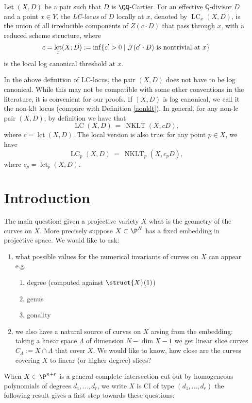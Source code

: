 \documentclass[12pt]{article}
\theoremstyle{plain}
\DeclareMathOperator{\NKLT}{NKLT}
\DeclareMathOperator{\LC}{LC}
\DeclareMathOperator{\lct}{lct}
\newcommand{\mb}[1]{\mathbb{#1}}
\begin{document}
\begin{defn}
Let $(X, D)$ be a pair such that $D$ is $\QQ$-Cartier. For an effective $\mb{Q}$-divisor $D$ and a point $x\in Y$, the \emph{LC-locus} of $D$ locally at $x$, denoted by $\LC_x(X,D)$, is the union of all irreducible components of $Z(c\cdot D)$ that pass through $x$, with a reduced scheme structure, where
\[ c = \lct_x(X;D) := \inf \{ c' > 0 \mid \mtc{J}(c' \cdot D) \text{ is nontrivial at } x \} \]
is the local log canonical threshold at $x$.
\end{defn}

\begin{remark}
    \textup{In the above definition of LC-locus, the pair $(X,D)$ does not have to be log canonical. While this may not be compatible with some other conventions in the literature, it is convenient for our proofs. If $(X,D)$ is log canonical, we call it the non-klt locus (compare with Definition \ref{nonklt}). In general, for any non-lc pair $(X,D)$, by definition we have that
    \[ \LC(X,D)\ =\ \NKLT(X,cD), \]
    where $c=\lct(X,D)$. The local version is also true: for any point $p\in X$, we have $$\LC_p(X,D)\ =\ \NKLT_p(X,c_pD),$$ where $c_p=\lct_p(X,D)$. }
\end{remark}

\newpage

\section{Introduction}

The main question: given a projective variety $X$ what is the geometry of the curves on $X$. More precisely suppose $X \subset \P^N$ has a fixed embedding in projective space. We would like to ask:
\begin{enumerate}
\item what possible values for the numerical invariants of curves on $X$ can appear e.g.
\begin{enumerate}
\item degree (computed against $\struct{X}(1)$)
\item genus 
\item gonality
\end{enumerate}
\item we also have a natural source of curves on $X$ arsing from the embedding: taking a linear space $\Lambda$ of dimension $N - \dim{X}-1$ we get linear slice curves $C_\Lambda := X \cap \Lambda$ that cover $X$. We would like to know, how close are the curves covering $X$ to linear (or higher degree) slices? 
\end{enumerate}
When $X \subset \P^{n+r}$ is a general complete intersection cut out by homogeneous polynomials of degrees $d_1, \dots, d_r$, we write $X$ is CI of type $(d_1, \dots, d_r)$ the following result gives a first step towards these questions:
\end{document}
